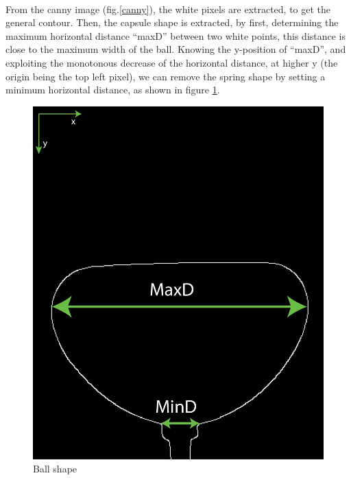\paragraph{}
From the canny image (fig.\ref{canny}), the white pixels are extracted, to get the general contour. Then, the capsule shape is extracted, by first, determining the maximum horizontal distance "`maxD"' between two white points, this distance is close to the maximum width of the ball. Knowing the y-position of "`maxD"', and exploiting the monotonous decrease of the horizontal distance, at higher y (the origin being the top left pixel), we can remove the spring shape by setting a minimum horizontal distance, as shown in figure \ref{fig:ball_shape}.

\begin{figure}[H] %
	\centering%
  \includegraphics[width=\textwidth]{figures/Chapter_1/ball_shape.png}
	\caption{Ball shape}
	\label{fig:ball_shape}
\end{figure}
